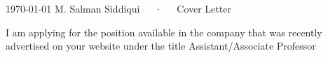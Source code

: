 \documentclass[11pt, a4paper]{awesome-cv}
\begin{document}
	
	\makecvheader
	
	\makecvfooter
	{\today}
	{M. Salman Siddiqui~~~·~~~Cover Letter}
	{}
	
	\makelettertitle
	
	\begin{cvletter}
		
		
		I am applying for the position available in the company that was recently advertised on your website under the title Assistant/Associate Professor
		

\end{cvletter}
\end{document}
